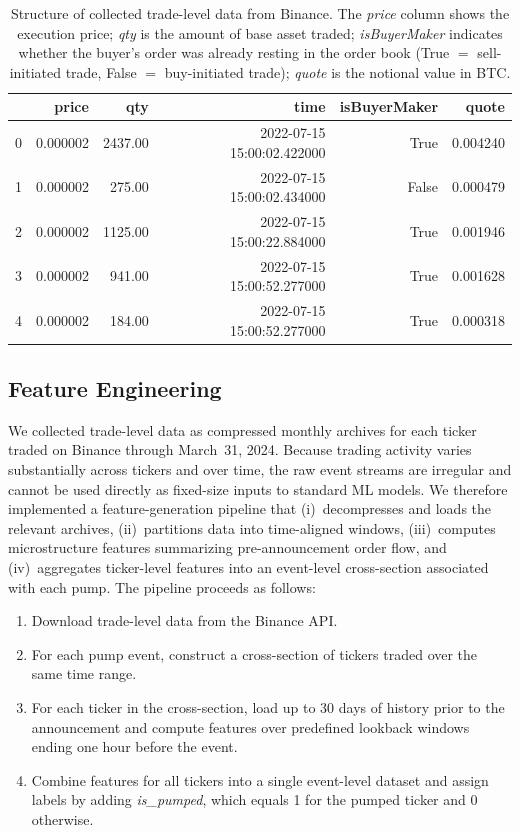 \documentclass{ieeeaccess}
\begin{document}
\begin{table}[!t]
    \centering
    \begin{tabular}{lrrrrr}
        \toprule
         & price & qty & time & isBuyerMaker & quote \\
        \midrule
        0 & 0.000002 & 2437.00 & 2022-07-15 15:00:02.422000 & True & 0.004240 \\
        1 & 0.000002 & 275.00& 2022-07-15 15:00:02.434000 & False & 0.000479 \\
        2 & 0.000002 & 1125.00 & 2022-07-15 15:00:22.884000 & True & 0.001946 \\
        3 & 0.000002 & 941.00 & 2022-07-15 15:00:52.277000 & True & 0.001628 \\
        4 & 0.000002 & 184.00 & 2022-07-15 15:00:52.277000 & True & 0.000318 \\
        \bottomrule
    \end{tabular}
    \caption{Structure of collected trade-level data from Binance. The \textit{price} column shows the execution price; \textit{qty} is the amount of base asset traded; \textit{isBuyerMaker} indicates whether the buyer's order was already resting in the order book (True $=$ sell-initiated trade, False $=$ buy-initiated trade); \textit{quote} is the notional value in BTC.}
    \label{table:collected_tick_data}
\end{table}


\subsection{Feature Engineering}

We collected trade-level data as compressed monthly archives for each ticker traded on Binance through March~31, 2024. Because trading activity varies substantially across tickers and over time, the raw event streams are irregular and cannot be used directly as fixed-size inputs to standard ML models. We therefore implemented a feature-generation pipeline that (i)~decompresses and loads the relevant archives, (ii)~partitions data into time-aligned windows, (iii)~computes microstructure features summarizing pre-announcement order flow, and (iv)~aggregates ticker-level features into an event-level cross-section associated with each pump. The pipeline proceeds as follows:

\begin{enumerate}
    \item Download trade-level data from the Binance API.
    \item For each pump event, construct a cross-section of tickers traded over the same time range.
    \item For each ticker in the cross-section, load up to 30 days of history prior to the announcement and compute features over predefined lookback windows ending one hour before the event.
    \item Combine features for all tickers into a single event-level dataset and assign labels by adding \textit{is\_pumped}, which equals 1 for the pumped ticker and 0 otherwise.
\end{enumerate}
\end{document}
